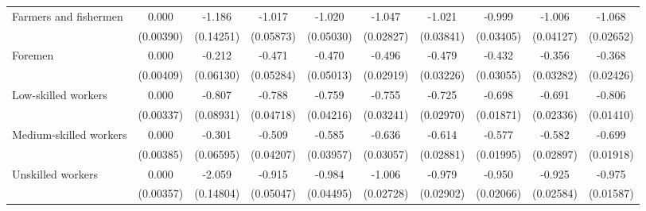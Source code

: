 {\begin{tabular}{l*{9}{c}}
Farmers and fishermen&       0.000         &      -1.186\sym{***}&      -1.017\sym{***}&      -1.020\sym{***}&      -1.047\sym{***}&      -1.021\sym{***}&      -0.999\sym{***}&      -1.006\sym{***}&      -1.068\sym{***}\\
                    &   (0.00390)         &   (0.14251)         &   (0.05873)         &   (0.05030)         &   (0.02827)         &   (0.03841)         &   (0.03405)         &   (0.04127)         &   (0.02652)         \\
Foremen             &       0.000         &      -0.212\sym{***}&      -0.471\sym{***}&      -0.470\sym{***}&      -0.496\sym{***}&      -0.479\sym{***}&      -0.432\sym{***}&      -0.356\sym{***}&      -0.368\sym{***}\\
                    &   (0.00409)         &   (0.06130)         &   (0.05284)         &   (0.05013)         &   (0.02919)         &   (0.03226)         &   (0.03055)         &   (0.03282)         &   (0.02426)         \\
Low-skilled workers &       0.000         &      -0.807\sym{***}&      -0.788\sym{***}&      -0.759\sym{***}&      -0.755\sym{***}&      -0.725\sym{***}&      -0.698\sym{***}&      -0.691\sym{***}&      -0.806\sym{***}\\
                    &   (0.00337)         &   (0.08931)         &   (0.04718)         &   (0.04216)         &   (0.03241)         &   (0.02970)         &   (0.01871)         &   (0.02336)         &   (0.01410)         \\
Medium-skilled workers&       0.000         &      -0.301\sym{***}&      -0.509\sym{***}&      -0.585\sym{***}&      -0.636\sym{***}&      -0.614\sym{***}&      -0.577\sym{***}&      -0.582\sym{***}&      -0.699\sym{***}\\
                    &   (0.00385)         &   (0.06595)         &   (0.04207)         &   (0.03957)         &   (0.03057)         &   (0.02881)         &   (0.01995)         &   (0.02897)         &   (0.01918)         \\
Unskilled workers   &       0.000         &      -2.059\sym{***}&      -0.915\sym{***}&      -0.984\sym{***}&      -1.006\sym{***}&      -0.979\sym{***}&      -0.950\sym{***}&      -0.925\sym{***}&      -0.975\sym{***}\\
                    &   (0.00357)         &   (0.14804)         &   (0.05047)         &   (0.04495)         &   (0.02728)         &   (0.02902)         &   (0.02066)         &   (0.02584)         &   (0.01587)         \\

\end{tabular}}
